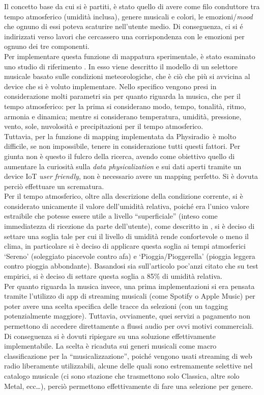 \documentclass[12pt,a4paper]{report}
\newcommand{\physiradio}{Physiradio} %
\begin{document}
Il concetto base da cui si è partiti, è stato quello di avere come filo conduttore tra tempo atmosferico (umidità inclusa), genere musicali e colori, le emozioni/\textit{mood} che ognuno di essi poteva scaturire nell'utente medio. Di conseguenza, ci si é indirizzati verso lavori che cercassero una corrispondenza con le emozioni per ognuno dei tre componenti.\\
Per implementare questa funzione di mappatura sperimentale, è stato esaminato uno studio di riferimento \cite{karmaker2015automated}. In esso viene descritto il modello di un selettore musicale basato sulle condizioni meteorologiche, che è ciò che più si avvicina al device che si è voluto implementare. Nello specifico vengono presi in considerazione molti parametri sia per quanto riguarda la musica, che per il tempo atmosferico: per la prima si considerano modo, tempo, tonalità, ritmo, armonia e dinamica; mentre si considerano temperatura, umidità, pressione, vento, sole, nuvolosità e precipitazioni per il tempo atmosferico.\\
Tuttavia, per la funzione di mapping implementata da \physiradio\ è molto difficile, se non impossibile, tenere in considerazione tutti questi fattori. Per giunta non è questo il fulcro della ricerca, avendo come obiettivo quello di aumentare la curiosità sulla \textit{data physicalization} e sui dati aperti tramite un device IoT \textit{user friendly}, non è necessario avere un mapping perfetto. Si è dovuta perciò effettuare un scrematura.\\
Per il tempo atmosferico, oltre alla descrizione della condizione corrente, si è considerato unicamente il valore dell'umidità relativa, poiché era l'unico valore estraibile che potesse essere utile a livello ``superficiale'' (inteso come immediatezza di ricezione da parte dell'utente), come descritto in \cite{humiditylevel}, si è deciso di settare una soglia tale per cui il livello di umidità rende confortevole o meno il clima, in particolare si è deciso di applicare questa soglia ai tempi atmosferici `Sereno' (soleggiato piacevole contro afa) e `Pioggia/Pioggerella' (pioggia leggera contro pioggia abbondante). Basandosi sia sull'articolo poc'anzi citato che su test empirici, si è deciso di settare questa soglia a 85\% di umidità relativa.\\

Per quanto riguarda la musica invece, una prima implementazioni si era pensata tramite l'utilizzo di app di streaming musicali (come Spotify o Apple Music) per poter avere una scelta specifica delle tracce da selezioni (con un tagging potenzialmente maggiore). Tuttavia, ovviamente, quei servizi a pagamento non permettono di accedere direttamente a flussi audio per ovvi motivi commerciali. \\
Di conseguenza si è dovuti ripiegare su una soluzione effettivamente implementabile. La scelta è ricaduta sui generi musicali come macro classificazione per la ``musicalizzazione'', poiché vengono usati streaming di web radio liberamente utilizzabili, alcune delle quali sono estremamente selettive nel catalogo musicale (ci sono stazione che trasmettono solo Classica, altre solo Metal, ecc\dots), perciò permettono effettivamente di fare una selezione per genere.\\
\end{document}
